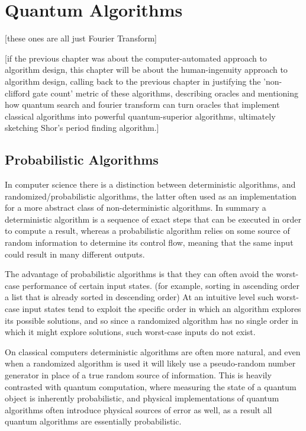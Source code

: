 \documentclass[]{article}
\begin{document}
\section{Quantum Algorithms}
[these ones are all just Fourier Transform]

[if the previous chapter was about the computer-automated approach to algorithm design, this chapter will be about the human-ingenuity approach to algorithm design, calling back to the previous chapter in justifying the 'non-clifford gate count' metric of these algorithms, describing oracles and mentioning how quantum search and fourier transform can turn oracles that implement classical algorithms into powerful quantum-superior algorithms, ultimately sketching Shor's period finding algorithm.]
\subsection{Probabilistic Algorithms}
In computer science there is a distinction between deterministic algorithms, and randomized/probabilistic algorithms, the latter often used as an implementation for a more abstract class of non-deterministic algorithms. In summary a deterministic algorithm is a sequence of exact steps that can be executed in order to compute a result, whereas a probabilistic algorithm relies on some source of random information to determine its control flow, meaning that the same input could result in many different outputs.

The advantage of probabilistic algorithms is that they can often avoid the worst-case performance of certain input states. (for example, sorting in ascending order a list that is already sorted in descending order) At an intuitive level such worst-case input states tend to exploit the specific order in which an algorithm explores its possible solutions, and so since a randomized algorithm has no single order in which it might explore solutions, such worst-case inputs do not exist.

On classical computers deterministic algorithms are often more natural, and even when a randomized algorithm is used it will likely use a pseudo-random number generator in place of a true random source of information. This is heavily contrasted with quantum computation, where measuring the state of a quantum object is inherently probabilistic, and physical implementations of quantum algorithms often introduce physical sources of error as well, as a result all quantum algorithms are essentially probabilistic.
\end{document}
